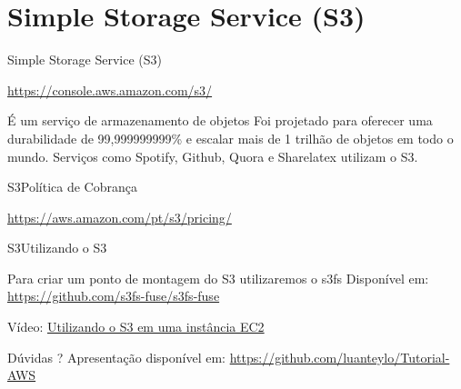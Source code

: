 \documentclass[xcolor=table]{beamer}
\begin{document}
\section{Simple Storage Service (S3)}
\begin{frame}[c]{Simple Storage Service (S3)}

        \begin{outline}
            \1[]\url{https://console.aws.amazon.com/s3/}
        \end{outline}
        
        \begin{center}
            \begin{outline}                
                \1 É um serviço de armazenamento de objetos
                \1 Foi projetado para oferecer uma durabilidade de 99,999999999\% e escalar mais de 1 trilhão de objetos em todo o mundo.
                \vskip 0.5cm
                \2[] Serviços como Spotify, Github, Quora e Sharelatex utilizam o S3.
            \end{outline}
        \end{center}  
        
\end{frame}


\begin{frame}[c]{S3}{Política de Cobrança}


        \begin{outline}
            \1[]\url{https://aws.amazon.com/pt/s3/pricing/}
        \end{outline}
        
            
            \begin{center}
                
            \end{center}           
       
\end{frame}


\begin{frame}[c]{S3}{Utilizando o S3}

        
        
            \begin{outline}
                \1 Para criar um ponto de montagem do S3 utilizaremos o s3fs
                \2 Disponível em: \url{https://github.com/s3fs-fuse/s3fs-fuse}
            \end{outline}
        
        \begin{center}
            Vídeo: \href{run:./6_mountS3.ogv}{Utilizando o S3 em uma instância EC2}
        \end{center}       
       
\end{frame}

{
\begin{frame}[c]{}

    \begin{center}

 
            Dúvidas ?
            \vskip 0.5cm
            Apresentação disponível em: \url{https://github.com/luanteylo/Tutorial-AWS}
             
      
         
    \end{center}
     
       
\end{frame}
}
\end{document}
